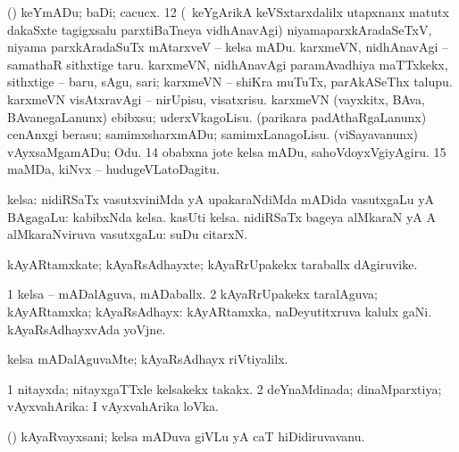 {{{{{{\begin{center}
 (\AmA) keYmADu; baDi; cacucx. 
\eanum
\numie
\num{12} (\kanmu\ keYgArikA keVSxtarxdalilx utapxnanx matutx dakaSxte tagigxsalu parxtiBaTneya vidhAnavAgi) niyamaparxkAradaSeTxV, niyama parxkAradaSuTx mAtarxveV -- kelsa mADu. 
  
\banum
{} karxmeVN, nidhAnavAgi -- samathaR sithxtige taru. 
 karxmeVN, nidhAnavAgi paramAvadhiya maTTxkekx, sithxtige -- baru, sAgu, sari; karxmeVN -- shiKra muTuTx, parAkASeThx talupu. 
 karxmeVN visAtxravAgi -- nirUpisu, visatxrisu. 
 karxmeVN (vayxkitx, BAva, BAvanegaLanunx) ebibxsu; uderxVkagoLisu. 
 (parikara padAthaRgaLanunx) cenAnxgi berasu; samimxsharxmADu; samimxLanagoLisu. 
 (viSayavanunx) vAyxsaMgamADu; Odu. 
\eanum
\numie
\num{14}  obabxna jote kelsa mADu, sahoVdoyxVgiyAgiru. 
\num{15}  maMDa, kiNvx -- hudugeVLatoDagitu. 
\enum
\emng
\eentry

\bentry
{}
\gl{\saupa}
\expl{}
\bmng
kelsa: 
\banum
{} nidiRSaTx vasutxviniMda yA upakaraNdiMda mADida vasutxgaLu yA BAgagaLu:  kabibxNda kelsa.  kasUti kelsa. 
 nidiRSaTx bageya alMkaraN yA A alMkaraNviruva vasutxgaLu:  suDu citarxN. 
\eanum
\emng
\eentry

\bentry
{} 
\gl{\nA}
\bmng
kAyARtamxkate; kAyaRsAdhayxte; kAyaRrUpakekx taraballx dAgiruvike. 
\emng
\eentry

\bentry
{} 
\gl{\gu}
\expl{}
\bmng
\bnum
\num{1} kelsa -- mADalAguva, mADaballx. 
\num{2} kAyaRrUpakekx taralAguva; kAyARtamxka; kAyaRsAdhayx:  kAyARtamxka, naDeyutitxruva kalulx gaNi.  kAyaRsAdhayxvAda yoVjne. 
\enum
\emng
\eentry

\bentry
{} 
\gl{\nA}
\expl{}
\bmng
{} 
\emng
\eentry

\bentry
{} 
\gl{\kirxvi}
\expl{}
\bmng
kelsa mADalAguvaMte; kAyaRsAdhayx riVtiyalilx. 
\emng
\eentry

\bentry
{} 
\gl{\gu}
\expl{}
\bmng
\bnum
\num{1} nitayxda; nitayxgaTTxle kelsakekx takakx. 
\num{2} deYnaMdinada; dinaMparxtiya; vAyxvahArika:  I vAyxvahArika loVka. 
\enum
\emng
\eentry

\bentry
{} 
\gl{\nA}
\expl{}
\bmng
(\AmA) kAyaRvayxsani; kelsa mADuva giVLu yA caT hiDidiruvavanu. 
\emng
\eentry


\end{center}}}}}}}
